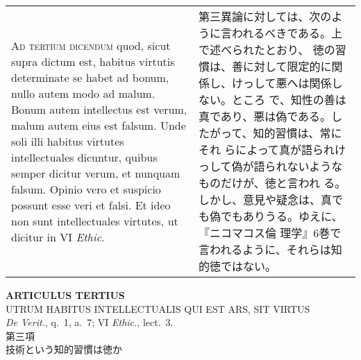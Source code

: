 \documentclass[10pt]{jsarticle}
\begin{document}
\begin{longtable}{p{21em}p{21em}}
{\scshape Ad tertium dicendum} quod, sicut supra dictum est, habitus
virtutis determinate se habet ad bonum, nullo autem modo ad
malum. Bonum autem intellectus est verum, malum autem eius est
falsum. Unde soli illi habitus virtutes intellectuales dicuntur,
quibus semper dicitur verum, et nunquam falsum. Opinio vero et
suspicio possunt esse veri et falsi. Et ideo non sunt intellectuales
virtutes, ut dicitur in VI {\itshape Ethic}.

&

第三異論に対しては、次のように言われるべきである。上で述べられたとおり、
徳の習慣は、善に対して限定的に関係し、けっして悪へは関係しない。ところ
で、知性の善は真であり、悪は偽である。したがって、知的習慣は、常にそれ
らによって真が語られけっして偽が語られないようなものだけが、徳と言われ
る。しかし、意見や疑念は、真でも偽でもありうる。ゆえに、『ニコマコス倫
理学』6巻で言われるように、それらは知的徳ではない。

\end{longtable}

\newpage

\begin{center}
 {\Large {\bf ARTICULUS TERTIUS}}\\ {\large UTRUM HABITUS
 INTELLECTUALIS QUI EST ARS, SIT VIRTUS}\\ {\footnotesize {\itshape De
 Verit.}, q.~1, a.~7; VI {\itshape Ethic.}, lect.~3.}\\ {\Large 第三項
 \\技術という知的習慣は徳か}
\end{center}
\end{document}
